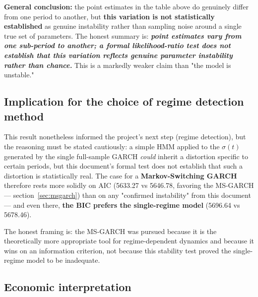 \documentclass[12pt,a4paper]{article}
\begin{document}
\newpage

\textbf{General conclusion:} the point estimates in the table
above do genuinely differ from one period to another, but
\textbf{this variation is not statistically established} as
genuine instability rather than sampling noise around a
single true set of parameters. The honest summary is: \textbf{\emph{point
		estimates vary from one sub-period to another; a formal
		likelihood-ratio test does not establish that this variation
		reflects genuine parameter instability rather than chance.}}
This is a markedly weaker claim than "the model is
unstable."

\subsection{Implication for the choice of regime detection method}

This result nonetheless informed the project's next step (regime
detection), but the reasoning must be stated cautiously: a
simple HMM applied to the $\sigma(t)$ generated by the single
full-sample GARCH \emph{could} inherit a distortion specific to
certain periods, but this document's formal test does not establish
that such a distortion is statistically real. The case for
a \textbf{Markov-Switching GARCH} therefore rests more solidly on
AIC (5633.27 vs 5646.78, favoring the MS-GARCH ---
section~\ref{sec:msgarch}) than on any "confirmed instability"
from this document --- and even there, \textbf{the BIC prefers the single-regime model} (5696.64 vs 5678.46). 

The honest framing is: the
MS-GARCH was pursued because it is the theoretically more
appropriate tool for regime-dependent dynamics and because it wins
on an information criterion, not because this stability test
proved the single-regime model to be inadequate.

\newpage

\subsection{Economic interpretation}
\end{document}
